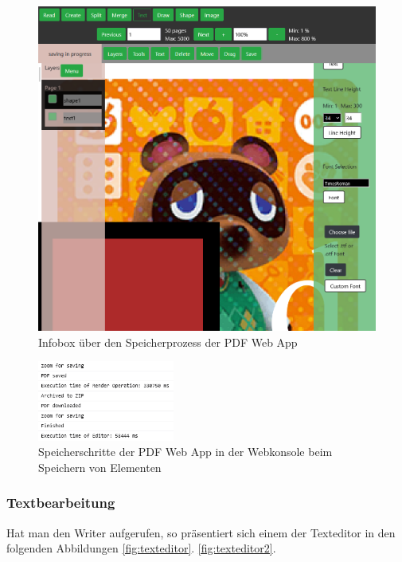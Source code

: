 \begin{figure}[!htbp]
	\centering
	\includegraphics[width=1\textwidth]{"images/save-info.png"}
	\caption{Infobox über den Speicherprozess der PDF Web App}
	\label{fig:save-info}
\end{figure}

\begin{figure}[!htbp]
	\centering
	\includegraphics[width=0.4\textwidth]{"images/save-progress-steps.png"}
	\caption{Speicherschritte der PDF Web App in der Webkonsole beim Speichern von Elementen}
	\label{fig:save-progress-steps}
\end{figure}

\subsubsection{Textbearbeitung}
Hat man den Writer aufgerufen, so präsentiert sich einem der Texteditor in den folgenden Abbildungen \ref{fig:texteditor}. \ref{fig:texteditor2}.

